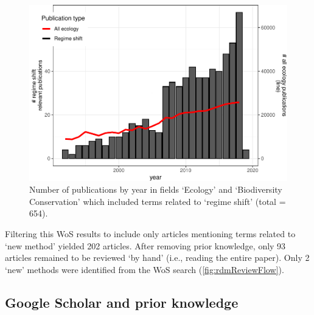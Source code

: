 \documentclass[12pt,twoside,openany]{reedthesis}
\begin{document}
\begin{figure}
\centering
\includegraphics{_myDissertation_files/figure-latex/wosRegimePubsByYearwithNumEcolPubs-1.pdf}
\caption{\label{fig:wosRegimePubsByYearwithNumEcolPubs}Number of
publications by year in fields `Ecology' and `Biodiversity Conservation'
which included terms related to `regime shift' (total = 654).}
\end{figure}
Filtering this WoS results to include only articles mentioning terms
related to `new method' yielded 202 articles. After removing prior
knowledge, only 93 articles remained to be reviewed `by hand' (i.e.,
reading the entire paper). Only 2 `new' methods were identified from the
WoS search (\ref{fig:rdmReviewFlow}).

\subsection{Google Scholar and prior
knowledge}\label{google-scholar-and-prior-knowledge}
\end{document}
